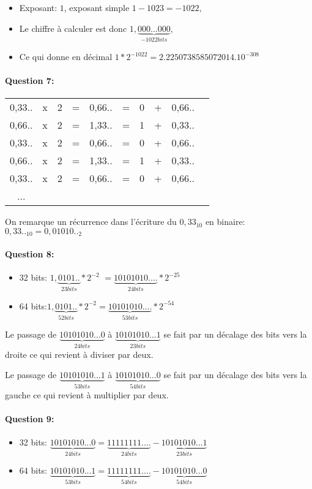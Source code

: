 \begin{itemize}
 \item Exposant: $1$, exposant simple $1-1023=-1022$,
 \item Le chiffre à calculer est donc $1,\underbrace{000...000}_{-1022 bits}$,
 \item Ce qui donne en décimal $1*2^{-1022}=2.2250738585072014.10^{-308}$
\end{itemize}

\paragraph{Question 7:}

\begin{tabular}{c c c c c c c c c c}
0,33.. & x & 2 & = & 0,66.. & = &  0 & + & 0,66.. \\
0,66.. & x & 2 & = & 1,33.. & = &  1 & + & 0,33.. \\
0,33.. & x & 2 & = & 0,66.. & = &  0 & + & 0,66.. \\
0,66.. & x & 2 & = & 1,33.. & = &  1 & + & 0,33.. \\
0,33.. & x & 2 & = & 0,66.. & = &  0 & + & 0,66.. \\
...
\end{tabular}

On remarque un récurrence dans l'écriture du $0,33_{10}$ en binaire: $0,33.._{10}=0,01010.._2$

\paragraph{Question 8:}
\begin{itemize}
 \item 32 bits: $1,\underbrace{0101..}_{23 bits}*2^{-2}$ $=\underbrace{10101010....}_{24 bits}*2^{-25}$
 \item 64 bits:$1,\underbrace{0101..}_{52 bits}*2^{-2}=\underbrace{10101010....}_{53 bits}*2^{-54}$
\end{itemize}

Le passage de $\underbrace{10101010...0}_{24 bits}$ à $\underbrace{10101010...1}_{23 bits}$ se fait par un décalage des bits vers la droite ce qui revient à diviser par deux.

Le passage de $\underbrace{10101010...1}_{53 bits}$ à $\underbrace{10101010...0}_{54 bits}$ se fait par un décalage des bits vers la gauche ce qui revient à multiplier par deux.

\paragraph{Question 9:}
\begin{itemize}
 \item 32 bits: $\underbrace{10101010...0}_{24 bits}=\underbrace{11111111....}_{24 bits}-\underbrace{10101010...1}_{23 bits}$
 \item 64 bits: $\underbrace{10101010...1}_{53 bits}=\underbrace{11111111....}_{54 bits}-\underbrace{10101010...0}_{54 bits}$
\end{itemize}

